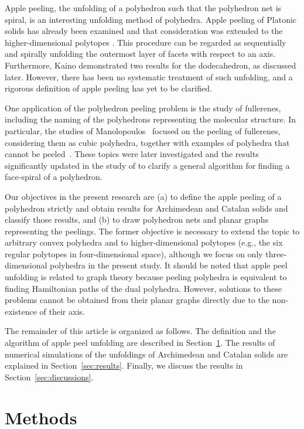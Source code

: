 \documentclass[12pt]{article}
\theoremstyle{plain}
\theoremstyle{definition}
\theoremstyle{remark}
\begin{document}
Apple peeling, the unfolding of a polyhedron such that the polyhedron net
is spiral, is an interesting unfolding method of polyhedra.
Apple peeling of Platonic solids has already been examined and that
consideration was extended to the higher-dimensional polytopes
\cite{Kaino2019}.
This procedure can be regarded as sequentially and spirally unfolding the
outermost layer of facets with respect to an axis.
Furthermore, Kaino demonstrated two results for the dodecahedron, as
discussed later.
However, there has been no systematic treatment of such unfolding, and a
rigorous definition of apple peeling has yet to be clarified.

One application of the polyhedron peeling problem is the study of
fullerenes, including the naming of the polyhedrons representing the
molecular structure.
In particular, the studies of Manolopoulos~\cite{Manolopoulos1991} focused
on the peeling of fullerenes, considering them as cubic polyhedra, together
with examples of polyhedra that cannot be peeled~\cite{Manolopoulos1993}.
These topics were later investigated and the results significantly updated
in the study of \cite{WSA2018} to clarify a general algorithm for finding
a face-spiral of a polyhedron.

Our objectives in the present research are (a) to define the apple peeling
of a polyhedron strictly and obtain results for Archimedean and Catalan
solids and classify those results, and (b) to draw polyhedron nets and
planar graphs representing the peelings.
The former objective is necessary to extend the topic to arbitrary convex
polyhedra and to higher-dimensional polytopes (e.g., the six regular
polytopes in four-dimensional space), although we focus on only
three-dimensional polyhedra in the present study.
It should be noted that apple peel unfolding is related to graph theory
because peeling polyhedra is equivalent to finding Hamiltonian paths of
the dual polyhedra.
However, solutions to these problems cannot be obtained from their planar
graphs directly due to the non-existence of their axis.

The remainder of this article is organized as follows.
The definition and the algorithm of apple peel unfolding are described in
Section~\ref{sec:methods}.
The results of numerical simulations of the unfoldings of Archimedean and
Catalan solids are explained in Section~\ref{sec:results}.
Finally, we discuss the results in Section~\ref{sec:discussions}.

\section{Methods}\label{sec:methods}
\end{document}
